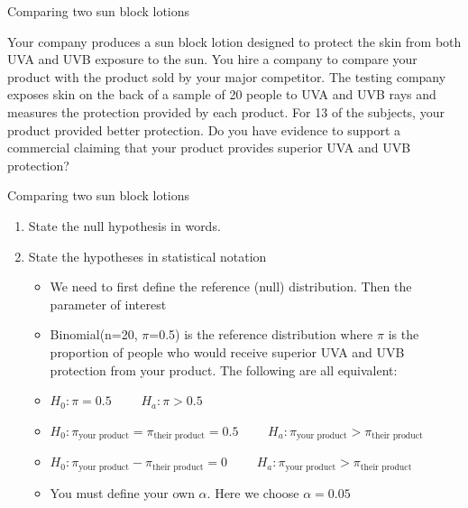 \documentclass{beamer}\usepackage[]{graphicx}\usepackage[]{color}
\begin{document}
\begin{frame}{Comparing two sun block lotions}

\begin{example}
	Your company produces a sun block lotion designed to protect the skin from both UVA and UVB exposure to the sun. You hire a company to compare your product with the product sold by your major competitor. The testing company exposes skin on the back of a sample of 20 people to UVA and UVB rays and measures the protection provided by each product. For 13 of the subjects, your product provided better protection. Do you have evidence to support a commercial claiming that your product provides superior UVA and UVB protection?
\end{example}


\end{frame}



\begin{frame}[fragile]{Comparing two sun block lotions}
\small
\begin{enumerate}
	\setlength\itemsep{1em}
	\item State the null hypothesis in words. \pause
	\item State the hypotheses in statistical notation \pause
	\begin{itemize}
			\setlength\itemsep{.71em}
		\item We need to first define the reference (null) distribution. Then the parameter of interest \pause
		\item Binomial(n=20, $\pi$=0.5) is the reference distribution where $\pi$ is the proportion of people who would receive superior UVA and UVB protection from your product. \pause
		The following are all equivalent: 
		\item[] $H_0: \pi = 0.5 \qquad$ $H_a: \pi > 0.5$ \pause
		\item[] $H_0: \pi_{\textrm{your product}}=\pi_{\textrm{their product}} = 0.5 \qquad$ $H_a: \pi_{\textrm{your product}} > \pi_{\textrm{their product}}$ \pause
		\item[] $H_0: \pi_{\textrm{your product}}-\pi_{\textrm{their product}} = 0 \qquad$ $H_a: \pi_{\textrm{your product}} > \pi_{\textrm{their product}}$ \pause
		\item You must define your own $\alpha$. Here we choose $\alpha=0.05$ 		
	\end{itemize}
      
 
\end{enumerate}

\end{frame}
\end{document}
